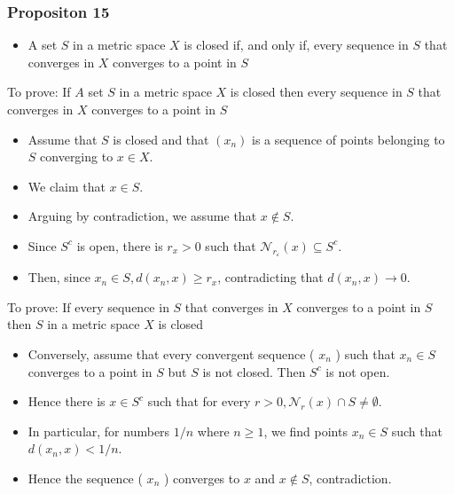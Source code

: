 \documentclass[12pt,a4paper]{article}
\begin{document}
 \subsubsection{Propositon 15} 
 \begin{itemize}
    \item A set \(S\) in a metric space \(X\) is closed if, and only if, every sequence in \(S\) that converges in \(X\) converges to a point in \(S\)
 \end{itemize}
To prove: If \(A\) set \(S\) in a metric space \(X\) is closed then every sequence in \(S\) that converges in \(X\) converges to a point in \(S\)
\begin{itemize}
    \item Assume that \(S\) is closed and that \(\left(x_n\right)\) is a sequence of points belonging to \(S\) converging to \(x \in X\).
    \item We claim that \(x \in S\).
    \item Arguing by contradiction, we assume that \(x \notin S\).
    \item Since \(S^c\) is open, there is \(r_x>0\) such that \(\mathcal{N}_{r_{\varepsilon}}(x) \subseteq S^c\).
    \item Then, since \(x_n \in S, d\left(x_n, x\right) \geq r_x\), contradicting that \(d\left(x_n, x\right) \rightarrow 0\).
\end{itemize}
To prove: If every sequence in \(S\) that converges in \(X\) converges to a point in \(S\) then \(S\) in a metric space \(X\) is closed
\begin{itemize}
    \item Conversely, assume that every convergent sequence ( \(x_n\) ) such that \(x_n \in S\) converges to a point in \(S\) but \(S\) is not closed. Then \(S^c\) is not open.
    \item Hence there is \(x \in S^c\) such that for every \(r>0, \mathcal{N}_r(x) \cap S \neq \emptyset\).
    \item In particular, for numbers \(1 / n\) where \(n \geq 1\), we find points \(x_n \in S\) such that \(d\left(x_n, x\right)<1 / n\).
    \item Hence the sequence ( \(x_n\) ) converges to \(x\) and \(x \notin S\), contradiction.
\end{itemize}
\end{document}

